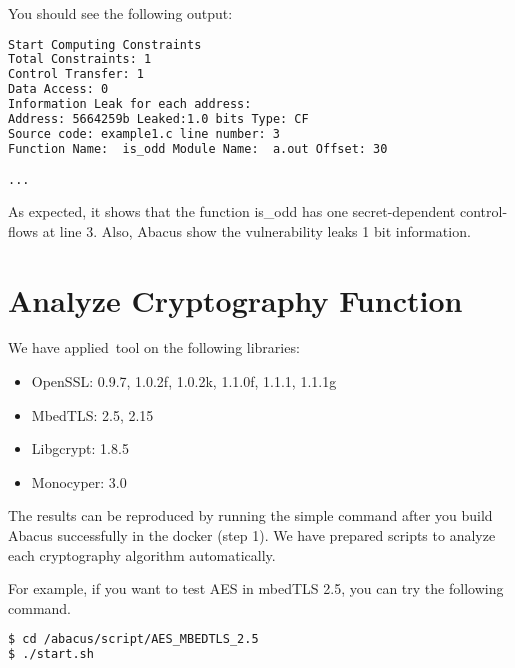 \documentclass[10pt,conference]{IEEEtran}
\begin{document}
You should see the following output:

\begin{lstlisting}[language=bash]
Start Computing Constraints
Total Constraints: 1
Control Transfer: 1
Data Access: 0
Information Leak for each address:
Address: 5664259b Leaked:1.0 bits Type: CF  
Source code: example1.c line number: 3
Function Name:  is_odd Module Name:  a.out Offset: 30

...
\end{lstlisting}

As expected, it shows that the function is\_odd has one secret-dependent control-flows at line 3. Also, Abacus show the vulnerability leaks 1 bit information.

\section{Analyze Cryptography Function}
We have applied~tool{} on the following libraries:
\begin{itemize}
\item OpenSSL: 0.9.7, 1.0.2f, 1.0.2k, 1.1.0f, 1.1.1, 1.1.1g
\item MbedTLS: 2.5, 2.15
\item Libgcrypt: 1.8.5
\item Monocyper: 3.0
\end{itemize}

The results can be reproduced by running the simple command after you build Abacus successfully in the docker (step 1). We have prepared scripts to analyze each cryptography algorithm automatically.

For example, if you want to test AES in mbedTLS 2.5, you can try the 
following command.

\begin{lstlisting}[language=bash]
$ cd /abacus/script/AES_MBEDTLS_2.5
$ ./start.sh
\end{lstlisting}
\end{document}
